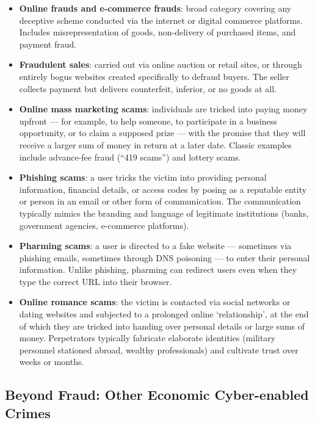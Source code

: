 \documentclass[11pt,a4paper,openany]{report}
\theoremstyle{definition}
\theoremstyle{plain}
\theoremstyle{remark}
\begin{document}
\begin{itemize}
    \item \textbf{Online frauds and e-commerce frauds}: broad category covering any deceptive scheme conducted via the internet or digital commerce platforms. Includes misrepresentation of goods, non-delivery of purchased items, and payment fraud.

    \item \textbf{Fraudulent sales}: carried out via online auction or retail sites, or through entirely bogus websites created specifically to defraud buyers. The seller collects payment but delivers counterfeit, inferior, or no goods at all.

    \item \textbf{Online mass marketing scams}: individuals are tricked into paying money upfront --- for example, to help someone, to participate in a business opportunity, or to claim a supposed prize --- with the promise that they will receive a larger sum of money in return at a later date. Classic examples include advance-fee fraud (``419 scams'') and lottery scams.

    \item \textbf{Phishing scams}: a user tricks the victim into providing personal information, financial details, or access codes by posing as a reputable entity or person in an email or other form of communication. The communication typically mimics the branding and language of legitimate institutions (banks, government agencies, e-commerce platforms).

    \item \textbf{Pharming scams}: a user is directed to a fake website --- sometimes via phishing emails, sometimes through DNS poisoning --- to enter their personal information. Unlike phishing, pharming can redirect users even when they type the correct URL into their browser.

    \item \textbf{Online romance scams}: the victim is contacted via social networks or dating websites and subjected to a prolonged online `relationship', at the end of which they are tricked into handing over personal details or large sums of money. Perpetrators typically fabricate elaborate identities (military personnel stationed abroad, wealthy professionals) and cultivate trust over weeks or months.
\end{itemize}

\subsection{Beyond Fraud: Other Economic Cyber-enabled Crimes}
\end{document}
